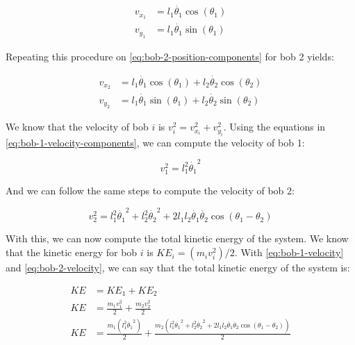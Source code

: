 \begin{equation}
    \begin{aligned}
        v_{x_1} &= l_1\dot{\theta_1}\cos\left(\theta_1\right)\\
        v_{y_1} &= l_1\dot{\theta_1}\sin\left(\theta_1\right)
    \end{aligned}
    \label{eq:bob-1-velocity-components}
\end{equation}

Repeating this procedure on \eqref{eq:bob-2-position-components} for bob 2 yields:

\begin{equation}
    \begin{aligned}
        v_{x_2} &= l_1\dot{\theta_1}\cos\left(\theta_1\right) + l_2\dot{\theta_2}\cos\left(\theta_2\right)\\
        v_{y_2} &= l_1\dot{\theta_1}\sin\left(\theta_1\right) + l_2\dot{\theta_2}\sin\left(\theta_2\right)
    \end{aligned}
    \label{eq:bob-2-velocity-components}
\end{equation}

We know that the velocity of bob $i$ is $v_i^2 = v_{x_i}^2 + v_{y_i}^2$. Using the equations in \eqref{eq:bob-1-velocity-components}, we can compute the velocity of bob 1:

\begin{equation}
    v_1^2 = l_1^2\dot{\theta_1}^2
    \label{eq:bob-1-velocity}
\end{equation}

And we can follow the same steps to compute the velocity of bob 2:

\begin{equation}
    v_2^2 = l_1^2\dot{\theta_1}^2 + l_2^2\dot{\theta_2}^2 + 2l_1l_2\dot{\theta_1}\dot{\theta_2}\cos\left(\theta_1 - \theta_2\right)
    \label{eq:bob-2-velocity}
\end{equation}

With this, we can now compute the total kinetic energy of the system. We know that the kinetic energy for bob $i$ is $KE_i = \left(m_i v_i^2\right)/2$. With \eqref{eq:bob-1-velocity} and \eqref{eq:bob-2-velocity}, we can say that the total kinetic energy of the system is:

\begin{align*}
    KE &= KE_1 + KE_2\\
    KE &= \frac{m_1 v_1^2}{2} + \frac{m_2 v_2^2}{2}\\
    KE &= \frac{m_1 \left(l_1^2\dot{\theta_1}^2\right)}{2} + \frac{m_2 \left(l_1^2\dot{\theta_1}^2 + l_2^2\dot{\theta_2}^2 + 2l_1l_2\dot{\theta_1}\dot{\theta_2}\cos\left(\theta_1 - \theta_2\right)\right)}{2}
\end{align*}

